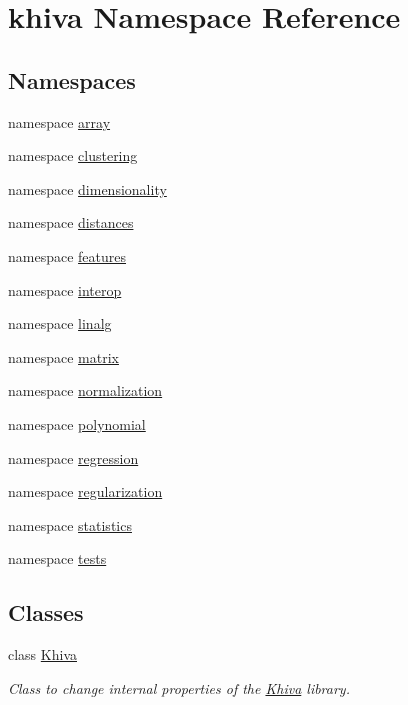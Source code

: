 \hypertarget{namespacekhiva}{}\section{khiva Namespace Reference}
\label{namespacekhiva}
\subsection*{Namespaces}
\begin{DoxyCompactItemize}
\item 
namespace \mbox{\hyperlink{namespacekhiva_1_1array}{array}}
\item 
namespace \mbox{\hyperlink{namespacekhiva_1_1clustering}{clustering}}
\item 
namespace \mbox{\hyperlink{namespacekhiva_1_1dimensionality}{dimensionality}}
\item 
namespace \mbox{\hyperlink{namespacekhiva_1_1distances}{distances}}
\item 
namespace \mbox{\hyperlink{namespacekhiva_1_1features}{features}}
\item 
namespace \mbox{\hyperlink{namespacekhiva_1_1interop}{interop}}
\item 
namespace \mbox{\hyperlink{namespacekhiva_1_1linalg}{linalg}}
\item 
namespace \mbox{\hyperlink{namespacekhiva_1_1matrix}{matrix}}
\item 
namespace \mbox{\hyperlink{namespacekhiva_1_1normalization}{normalization}}
\item 
namespace \mbox{\hyperlink{namespacekhiva_1_1polynomial}{polynomial}}
\item 
namespace \mbox{\hyperlink{namespacekhiva_1_1regression}{regression}}
\item 
namespace \mbox{\hyperlink{namespacekhiva_1_1regularization}{regularization}}
\item 
namespace \mbox{\hyperlink{namespacekhiva_1_1statistics}{statistics}}
\item 
namespace \mbox{\hyperlink{namespacekhiva_1_1tests}{tests}}
\end{DoxyCompactItemize}
\subsection*{Classes}
\begin{DoxyCompactItemize}
\item 
class \mbox{\hyperlink{classkhiva_1_1_khiva}{Khiva}}
\begin{DoxyCompactList}\small\item\em Class to change internal properties of the \mbox{\hyperlink{classkhiva_1_1_khiva}{Khiva}} library. \end{DoxyCompactList}\end{DoxyCompactItemize}
